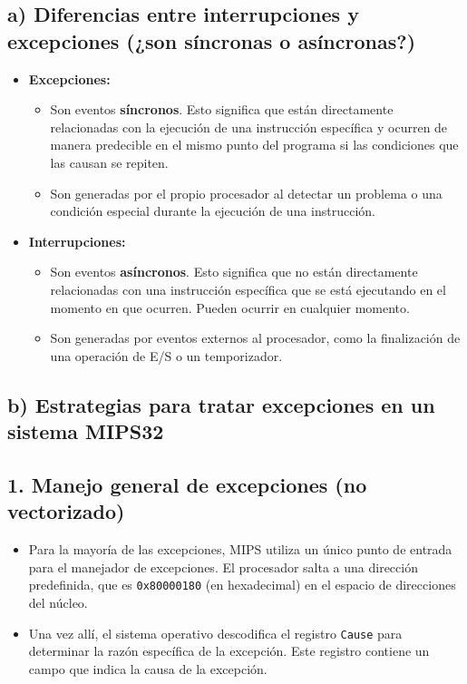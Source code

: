 \documentclass{article}
\begin{document}
\subsection*{a) Diferencias entre interrupciones y excepciones (¿son síncronas o asíncronas?)}

\begin{itemize}
    \item \textbf{Excepciones:}
    \begin{itemize}
        \item Son eventos \textbf{síncronos}. Esto significa que están directamente relacionadas con la ejecución de una instrucción específica y ocurren de manera predecible en el mismo punto del programa si las condiciones que las causan se repiten.
        \item Son generadas por el propio procesador al detectar un problema o una condición especial durante la ejecución de una instrucción.
    \end{itemize}
    
    \item \textbf{Interrupciones:}
    \begin{itemize}
        \item Son eventos \textbf{asíncronos}. Esto significa que no están directamente relacionadas con una instrucción específica que se está ejecutando en el momento en que ocurren. Pueden ocurrir en cualquier momento.
        \item Son generadas por eventos externos al procesador, como la finalización de una operación de E/S o un temporizador.
    \end{itemize}
\end{itemize}

\subsection*{b) Estrategias para tratar excepciones en un sistema MIPS32}

\subsection*{1. Manejo general de excepciones (no vectorizado)}
\begin{itemize}
    \item Para la mayoría de las excepciones, MIPS utiliza un único punto de entrada para el manejador de excepciones. El procesador salta a una dirección predefinida, que es \texttt{0x80000180} (en hexadecimal) en el espacio de direcciones del núcleo.
    \item Una vez allí, el sistema operativo descodifica el registro \texttt{Cause} para determinar la razón específica de la excepción. Este registro contiene un campo que indica la causa de la excepción.
\end{itemize}
\end{document}
